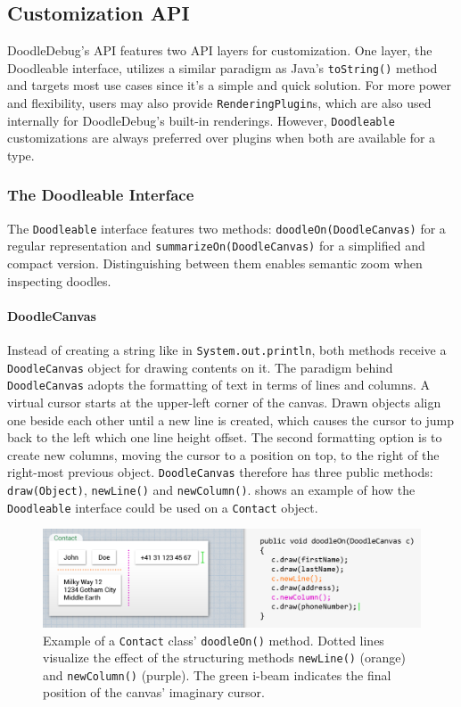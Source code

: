 \documentclass[english]{scrartcl}
\newcommand{\DD}{Dood\-le\-De\-bug\xspace}
\newcommand{\println}{\texttt{Sys\-tem.\-out.\-println}\xspace}
\begin{document}
\subsection{Customization API}
\DD's API features two API layers for customization.
One layer, the Doodleable interface, utilizes a similar paradigm as Java's \texttt{toString()} method and targets most use cases since it's a simple and quick solution.
For more power and flexibility, users may also provide \texttt{RenderingPlugin}s, which are also used internally for \DD's built-in renderings.
However, \texttt{Doodleable} customizations are always preferred over plugins when both are available for a type.

\subsubsection{The Doodleable Interface}

The \texttt{Doodleable} interface features two methods: \texttt{doodleOn(DoodleCanvas)} for a regular representation and \texttt{summarizeOn(DoodleCanvas)} for a simplified and compact version.
Distinguishing between them enables semantic zoom \cite{semantic-zoom} when inspecting doodles.

\paragraph{DoodleCanvas}
Instead of creating a string like in \println, both methods receive a \texttt{DoodleCanvas} object for drawing contents on it.
The paradigm behind \texttt{DoodleCanvas} adopts the formatting of text in terms of lines and columns.
A virtual cursor starts at the upper-left corner of the canvas.
Drawn objects align one beside each other until a new line is created, which causes the cursor to jump back to the left which one line height offset.
The second formatting option is to create new columns, moving the cursor to a position on top, to the right of the right-most previous object.
\texttt{DoodleCanvas} therefore has three public methods: \texttt{draw(Object)}, \texttt{newLine()} and \texttt{newColumn()}.
 shows an example of how the \texttt{Doodleable} interface could be used on a \texttt{Contact} object.

\begin{figure}[h]
	\includegraphics[width=\linewidth]{img/doodleable-example.png}
	\caption[Usage of the \texttt{Doodleable} interface]{Example of a \texttt{Contact} class' \texttt{doodleOn()} method.
Dotted lines visualize the effect of the structuring methods \texttt{newLine()} (orange) and \texttt{newColumn()} (purple).
The green i-beam indicates the final position of the canvas' imaginary cursor.}
\end{figure}
\end{document}
